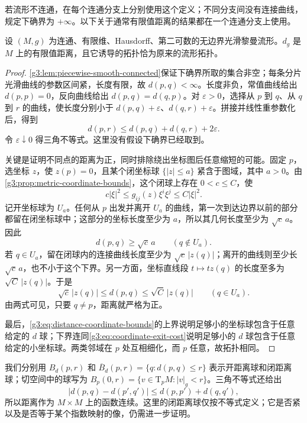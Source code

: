 若流形不连通，在每个连通分支上分别使用这个定义；不同分支间没有连接曲线，规定下确界为 \(+\infty\)。以下关于通常有限值距离的结果都在一个连通分支上使用。

\begin{theorem}
	\label{g3:thm:riemannian-distance}
	设 \((M,g)\) 为连通、有限维、Hausdorff、第二可数的无边界光滑黎曼流形。\(d_g\) 是 \(M\) 上的有限值距离，且它诱导的拓扑恰为原来的流形拓扑。
\end{theorem}
\begin{proof}
	\cref{g3:lem:piecewise-smooth-connected}保证下确界所取的集合非空；每条分片光滑曲线的参数区间紧，长度有限，故 \(d(p,q)<\infty\)。长度非负，常值曲线给出 \(d(p,p)=0\)，反向曲线给出 \(d(p,q)=d(q,p)\)。对 \(\varepsilon>0\)，选择从 \(p\) 到 \(q\)、从 \(q\) 到 \(r\) 的曲线，使长度分别小于 \(d(p,q)+\varepsilon\)、\(d(q,r)+\varepsilon\)。拼接并线性重参数化后，得到
	\[
		d(p,r)\leq d(p,q)+d(q,r)+2\varepsilon.
	\]
	令 \(\varepsilon\downarrow0\) 得三角不等式。这里没有假设下确界已经取到。

	关键是证明不同点的距离为正，同时排除绕出坐标图后任意缩短的可能。固定 \(p\)，选坐标 \(z\)，使 \(z(p)=0\)，且某个闭坐标球 \(\{|z|\leq a\}\) 紧含于图域，其中 \(a>0\)。由\cref{g3:prop:metric-coordinate-bounds}，这个闭球上存在 \(0<c\leq C\)，使
	\[
		c|\xi|^2\leq g_{ij}(z)\xi^i\xi^j\leq C|\xi|^2.
	\]
	记开坐标球为 \(U_a\)。任何从 \(p\) 出发并离开 \(U_a\) 的曲线，第一次到达边界以前的部分都留在闭坐标球中；这部分的坐标长度至少为 \(a\)，所以其几何长度至少为 \(\sqrt c\,a\)。因此
	\begin{equation}
		\label{g3:eq:coordinate-exit-cost}
		d(p,q)\geq\sqrt c\,a\qquad(q\notin U_a).
	\end{equation}
	若 \(q\in U_a\)，留在闭球内的连接曲线长度至少为 \(\sqrt c\,|z(q)|\)；离开的曲线则至少长 \(\sqrt c\,a\)，也不小于这个下界。另一方面，坐标直线段 \(t\mapsto tz(q)\) 的长度至多为 \(\sqrt C\,|z(q)|\)。于是
	\begin{equation}
		\label{g3:eq:distance-coordinate-bounds}
		\sqrt c\,|z(q)|\leq d(p,q)\leq\sqrt C\,|z(q)|
		\qquad(q\in U_a).
	\end{equation}
	由两式可见，只要 \(q\ne p\)，距离就严格为正。

	最后，\eqref{g3:eq:distance-coordinate-bounds}的上界说明足够小的坐标球包含于任意给定的 \(d\) 球；下界连同\eqref{g3:eq:coordinate-exit-cost}说明足够小的 \(d\) 球包含于任意给定的小坐标球。两类邻域在 \(p\) 处互相细化，而 \(p\) 任意，故拓扑相同。
\end{proof}

我们分别用 \(B_d(p,r)\) 和 \(\overline B_d(p,r)=\{q:d(p,q)\leq r\}\) 表示开距离球和闭距离球；切空间中的球写为 \(B_p(0,r)=\{v\in\mathrm{T}_pM:|v|_g<r\}\)。三角不等式还给出
\[
	|d(p,q)-d(p',q')|\leq d(p,p')+d(q,q'),
\]
所以距离作为 \(M\times M\) 上的函数连续。这里的闭距离球仅按不等式定义；它是否紧以及是否等于某个指数映射的像，仍需进一步证明。

